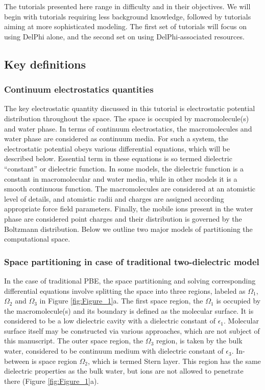 \documentclass[9pt,tutorial]{livecoms}
\begin{document}
The tutorials presented here range in difficulty and in their objectives. We will begin with tutorials requiring less background knowledge, followed by tutorials aiming at more sophisticated modeling. The first set of tutorials will focus on using DelPhi alone, and the second set on using DelPhi-associated resources.

\subsection{Key definitions}

\subsubsection{Continuum electrostatics quantities}
The key electrostatic quantity discussed in this tutorial is electrostatic potential distribution throughout the space. The space is occupied by macromolecule(s) and water phase. In terms of continuum electrostatics, the macromolecules and water phase are considered as continuum media. For such a system, the electrostatic potential obeys various differential equations, which will be described below. Essential term in these equations is so termed dielectric “constant” or dielectric function. In some models, the dielectric function is a constant in macromolecular and water media, while in other models it is a smooth continuous function. The macromolecules are considered at an atomistic level of details, and atomistic radii and charges are assigned according appropriate force field parameters. Finally, the mobile ions present in the water phase are considered point charges and their distribution is governed by the Boltzmann distribution. Below we outline two major models of partitioning the computational space. 

\subsubsection{Space partitioning in case of traditional two-dielectric model}
In the case of traditional PBE, the space partitioning and solving corresponding differential equations involve splitting the space into three regions, labeled as $ \Omega_1 $, $ \Omega_2 $ and $ \Omega_3 $ in Figure \ref{fig:Figure_1}a. The first space region, the $\Omega_1$ is occupied by the macromolecule(s) and its boundary is defined as the molecular surface. It is considered to be a low dielectric cavity with a dielectric constant of $\epsilon_1$. Molecular surface itself may be constructed via various approaches, which are not subject of this manuscript. The outer space region, the $\Omega_3$ region, is taken by the bulk water, considered to be continuum medium with dielectric constant of $\epsilon_3$. In-between is space region $\Omega_2$, which is termed Stern layer. This region has the same dielectric properties as the bulk water, but ions are not allowed to penetrate there (Figure \ref{fig:Figure_1}a).
\end{document}
